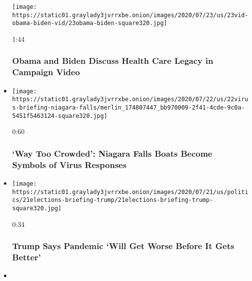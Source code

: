 \begin{itemize}
  \texttt{[image: https://static01.graylady3jvrrxbe.onion/images/2020/07/23/us/23vid-obama-biden-vid/23obama-biden-square320.jpg]}

  1:44

  \hypertarget{obama-and-biden-discuss-health-care-legacy-in-campaign-video}{%
  \subsubsection{Obama and Biden Discuss Health Care Legacy in Campaign
  Video}\label{obama-and-biden-discuss-health-care-legacy-in-campaign-video}}
\item
  \href{https://www.nytimes3xbfgragh.onion/video/world/europe/100000007251464/niagara-falls-tour-boats.html?action=click\&module=video-series-bar\&region=header\&pgtype=Article\&playlistId=video/coronavirus-news-update}{}

  \texttt{[image: https://static01.graylady3jvrrxbe.onion/images/2020/07/22/us/22virus-briefing-niagara-falls/merlin\_174807447\_bb970009-2f41-4cde-9c0a-5451f5463124-square320.jpg]}

  0:60

  \hypertarget{way-too-crowded-niagara-falls-boats-become-symbols-of-virus-responses}{%
  \subsubsection{`Way Too Crowded': Niagara Falls Boats Become Symbols
  of Virus
  Responses}\label{way-too-crowded-niagara-falls-boats-become-symbols-of-virus-responses}}
\item
  \href{https://www.nytimes3xbfgragh.onion/video/us/100000007250068/trump-says-virus-worse-before-better.html?action=click\&module=video-series-bar\&region=header\&pgtype=Article\&playlistId=video/coronavirus-news-update}{}

  \texttt{[image: https://static01.graylady3jvrrxbe.onion/images/2020/07/21/us/politics/21elections-briefing-trump/21elections-briefing-trump-square320.jpg]}

  0:34

  \hypertarget{trump-says-pandemic-will-get-worse-before-it-gets-better}{%
  \subsubsection{Trump Says Pandemic `Will Get Worse Before It Gets
  Better'}\label{trump-says-pandemic-will-get-worse-before-it-gets-better}}
\item
  \href{https://www.nytimes3xbfgragh.onion/video/us/100000007250230/mcconnell-proposal-relief-package.html?action=click\&module=video-series-bar\&region=header\&pgtype=Article\&playlistId=video/coronavirus-news-update}{}


\end{itemize}
